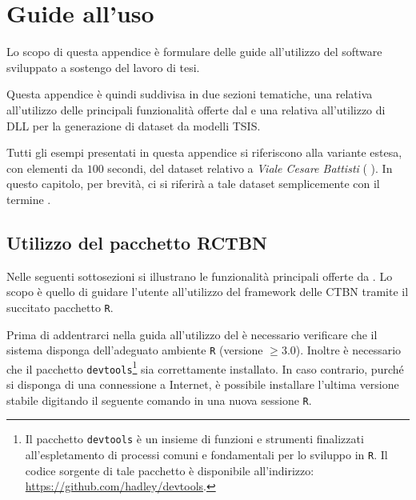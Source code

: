 
\chapter{Guide all'uso}
\label{cap:guide}
Lo scopo di questa appendice è formulare delle guide all'utilizzo del software sviluppato a sostengo del lavoro di tesi.

Questa appendice è quindi suddivisa in due sezioni tematiche, una relativa all'utilizzo delle principali funzionalità offerte dal \pacchettor{} e una relativa all'utilizzo di  \acs{DLL} per la generazione di dataset da modelli \acs{TSIS}.

Tutti gli esempi presentati in questa appendice si riferiscono alla variante estesa, con elementi da $100$ secondi, del dataset relativo a \emph{Viale Cesare Battisti} (\ie{} ). In questo capitolo, per brevità, ci si riferirà a tale dataset semplicemente con il termine .

\section{Utilizzo del pacchetto RCTBN}\label{sec:package-howto}
Nelle seguenti sottosezioni si illustrano le funzionalità principali offerte da \rctbn{}. Lo scopo è quello di guidare l'utente all'utilizzo del framework delle \acs{CTBN} tramite il succitato pacchetto \lstinline[]|R|.

Prima di addentrarci nella guida all'utilizzo del \pacchettor{} è necessario verificare che il sistema disponga dell'adeguato ambiente \lstinline[]|R| (versione $\ge 3.0$). Inoltre è necessario che il pacchetto \lstinline[]|devtools|\footnote{Il pacchetto \lstinline[]|devtools| \citep{DEVTOOLS2013} è un insieme di funzioni e strumenti finalizzati all'espletamento di processi comuni e fondamentali per lo sviluppo in \lstinline[]|R|. Il codice sorgente di tale pacchetto è disponibile all'indirizzo: \url{https://github.com/hadley/devtools}.} sia correttamente installato. In caso contrario, purché si disponga di una connessione a Internet, è possibile installare l'ultima versione stabile digitando il seguente comando in una nuova sessione \lstinline[]|R|.

\vspace*{8pt}

